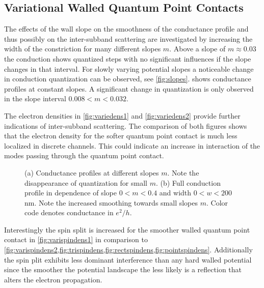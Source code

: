 \subsection{Variational Walled Quantum Point Contacts}
The effects of  the wall slope on the smoothness of the conductance profile and thus possibly on the inter-subband scattering are investigated by increasing the width of the constriction for many different slopes $m$. Above a slope of $m \approx 0.03$ the conduction shows quantized steps with no significant influences if the slope changes in that interval. For slowly varying potential slopes a noticeable change in conduction quantization can be observed, see \cref{fig:slopes}.  shows conductance profiles at constant slopes. A significant change in quantization is only observed in the slope interval $0.008 < m < 0.032$.\par
The electron densities in \cref{fig:variedens1} and \cref{fig:variedens2} provide further indications of inter-subband scattering. The comparison of both figures shows that the electron density for the softer quantum point contact is much less localized in discrete channels. This could indicate an increase in interaction of the modes passing through the quantum point contact.\par
\begin{figure}[h] 
\centering
{}
\caption{(a) Conductance profiles at different slopes $m$. Note the disappearance of quantization for small $m$. (b) Full conduction profile in dependence of slope $0 < m < 0.4$ and width $0 < w < 200$ nm. Note the increased smoothing towards small slopes $m$. Color code denotes conductance in $e^2/h$.}\label{fig:conductances}
\end{figure}
Interestingly the spin split is increased for the smoother walled quantum point contact in \cref{fig:varispindens1} in comparison to \cref{fig:varispindens2,fig:trispindens,fig:rectspindens,fig:pointspindens}. Additionally the spin plit exhibits less dominant interference than any hard walled potential since the smoother the potential landscape the less likely is a reflection that alters the electron propagation.\par
